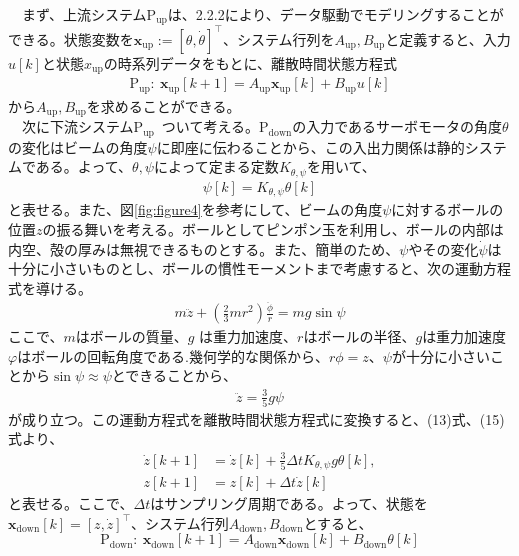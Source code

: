 \documentclass[a4paper,10.5pt]{ltjsarticle}
\begin{document}
　まず、上流システム$\mathrm{P_{up}}$は、2.2.2により、データ駆動でモデリングすることができる。状態変数を$\bm x_\mathrm{up}:=[\theta,\dot{\theta}]^\top$、システム行列を$A_\mathrm{up},B_\mathrm{up}$と定義すると、入力$u[k]$と状態$x_\mathrm{up}$の時系列データをもとに、離散時間状態方程式
\begin{align}
  \mathrm{P_{up}}:\ \bm x_\mathrm{up}[k+1]=A_\mathrm{up}\bm x_\mathrm{up}[k]+B_\mathrm{up}u[k]
\end{align}
から$A_\mathrm{up},B_\mathrm{up}$を求めることができる。\\
　次に下流システム$\mathrm{P_{up}}$ ついて考える。$\mathrm{P_{down}}$の入力であるサーボモータの角度$\theta$の変化はビームの角度$\psi$に即座に伝わることから、この入出力関係は静的システムである。よって、$\theta,\psi$によって定まる定数$K_{\theta,\psi}$を用いて、
\begin{align}
  \psi[k]=K_{\theta,\psi}\theta[k]
\end{align}
と表せる。また、図\ref{fig:figure4}を参考にして、ビームの角度$\psi$に対するボールの位置$z$の振る舞いを考える。ボールとしてピンポン玉を利用し、ボールの内部は内空、殻の厚みは無視できるものとする。また、簡単のため、$\psi$やその変化$\dot{\psi}$は十分に小さいものとし、ボールの慣性モーメントまで考慮すると、次の運動方程式を導ける。
\begin{align}
  m\ddot{z}+\left(\frac{2}{3}mr^2\right)\frac{\ddot{\phi}}{r}=mg\sin{\psi}
\end{align}
ここで、$m$はボールの質量、$g$ は重力加速度、$r$はボールの半径、$g$は重力加速度$φ$はボールの回転角度である.幾何学的な関係から、$r\phi=z$、$\psi$が十分に小さいことから$\sin{\psi}\approx\psi$とできることから、
\begin{align}
  \ddot{z}=\frac{3}{5}g\psi
\end{align}
が成り立つ。この運動方程式を離散時間状態方程式に変換すると、(13)式、(15)式より、
\begin{align}
  \dot{z}[k+1]&=\dot{z}[k]+\frac{3}{5}\Delta tK_{\theta,\psi}g\theta[k],\\
  z[k+1]&=z[k]+\Delta t \dot{z}[k]
\end{align}
と表せる。ここで、$\Delta t$はサンプリング周期である。よって、状態を$\bm x_\mathrm{down}[k]=[z,\dot{z}]^\top$、システム行列$A_\mathrm{down},B_\mathrm{down}$とすると、
\begin{equation}
  \mathrm{P_{down}}:\ \bm x_\mathrm{down}[k+1]=A_\mathrm{down}\bm x_\mathrm{down}[k]+B_\mathrm{down}\theta[k]
\end{equation}
\end{document}
